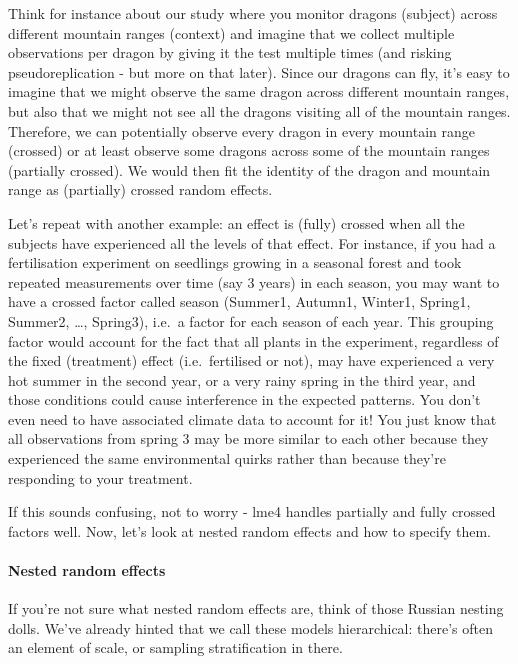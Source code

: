 \documentclass[
]{article}
\begin{document}
Think for instance about our study where you monitor dragons (subject)
across different mountain ranges (context) and imagine that we collect
multiple observations per dragon by giving it the test multiple times
(and risking pseudoreplication - but more on that later). Since our
dragons can fly, it's easy to imagine that we might observe the same
dragon across different mountain ranges, but also that we might not see
all the dragons visiting all of the mountain ranges. Therefore, we can
potentially observe every dragon in every mountain range (crossed) or at
least observe some dragons across some of the mountain ranges (partially
crossed). We would then fit the identity of the dragon and mountain
range as (partially) crossed random effects.

Let's repeat with another example: an effect is (fully) crossed when all
the subjects have experienced all the levels of that effect. For
instance, if you had a fertilisation experiment on seedlings growing in
a seasonal forest and took repeated measurements over time (say 3 years)
in each season, you may want to have a crossed factor called season
(Summer1, Autumn1, Winter1, Spring1, Summer2, \ldots, Spring3), i.e.~a
factor for each season of each year. This grouping factor would account
for the fact that all plants in the experiment, regardless of the fixed
(treatment) effect (i.e.~fertilised or not), may have experienced a very
hot summer in the second year, or a very rainy spring in the third year,
and those conditions could cause interference in the expected patterns.
You don't even need to have associated climate data to account for it!
You just know that all observations from spring 3 may be more similar to
each other because they experienced the same environmental quirks rather
than because they're responding to your treatment.

If this sounds confusing, not to worry - lme4 handles partially and
fully crossed factors well. Now, let's look at nested random effects and
how to specify them.

\paragraph{Nested random effects}\label{nested-random-effects}

If you're not sure what nested random effects are, think of those
Russian nesting dolls. We've already hinted that we call these models
hierarchical: there's often an element of scale, or sampling
stratification in there.
\end{document}
